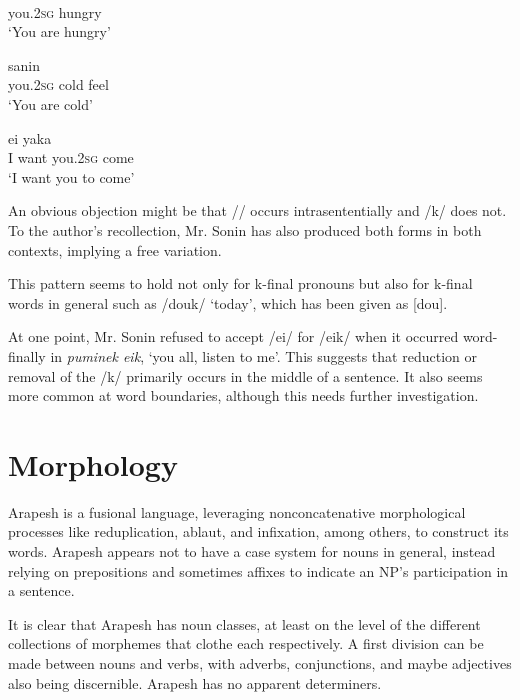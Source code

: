 \documentclass[pdftex,12pt,letterpaper]{article}
\let\ipa\textipa
\begin{document}
 \begin{minipage}{\textwidth}
 \begin{exe}
 \ex
 \gll \ipa{\textltailn@k} \ipa{\textltailn 1r1bain} \\
 you.\textsc{2sg} hungry \\
 \trans `You are hungry'

 \ex
 \gll \ipa{\textltailn @k} \ipa{\textltailn uman@g@s} sanin\\
 you.\textsc{2sg} cold feel \\
 \trans `You are cold'

 \ex
 \gll ei yaka \ipa{\textltailn @} \ipa{\textltailn @naki} \\
 I want you.\textsc{2sg} come \\
 \trans `I want you to come'

 \end{exe}
 \vspace{10pt}
 \end{minipage}

 \noindent An obvious objection might be that /\ipa{\textltailn @}/ occurs intrasententially and /\ipa{\textltailn @}k/ does not. To the author's recollection, Mr. Sonin has also produced both forms in both contexts, implying a free variation. 

This pattern seems to hold not only for k-final pronouns but also for k-final words in general such as /douk/ `today', which has been given as [dou].

At one point, Mr. Sonin refused to accept /ei/ for /eik/ when it occurred word-finally in \emph{puminek eik}, `you all, listen to me'. This suggests that reduction or removal of the /k/ primarily occurs in the middle of a sentence. It also seems more common at word boundaries, although this needs further investigation.

\pagebreak
 \section{Morphology}

 Arapesh is a fusional language, leveraging nonconcatenative morphological processes like reduplication, ablaut, and infixation, among others, to construct its words. Arapesh appears not to have a case system for nouns in general, instead relying on prepositions and sometimes affixes to indicate an NP's participation in a sentence.

 It is clear that Arapesh has noun classes, at least on the level of the different collections of morphemes that clothe each respectively. A first division can be made between nouns and verbs, with adverbs, conjunctions, and maybe adjectives also being discernible. Arapesh has no apparent determiners. 
\end{document}
